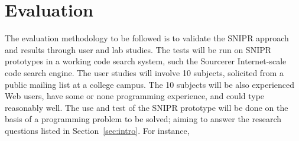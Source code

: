 \documentclass[conference]{IEEEtran}
\begin{document}
\section{Evaluation}
\label{sec:evaluate}

The evaluation methodology to be followed is to validate the \uppercase{SnipR} approach and results through user and lab studies. The tests will be run on \uppercase{SnipR} prototypes in a working code search system, such the Sourcerer\cite{Bajracharya:2006vn} Internet-scale code search engine. The user studies will involve 10 subjects, solicited from a public mailing list at a college campus. The 10 subjects will be also experienced Web users, have some or none programming experience, and could type reasonably well. The use and test of the \uppercase{SnipR} prototype will be done on the basis of a programming problem to be solved; aiming to answer the research questions listed in Section~\ref{sec:intro}. For instance, 
\end{document}
